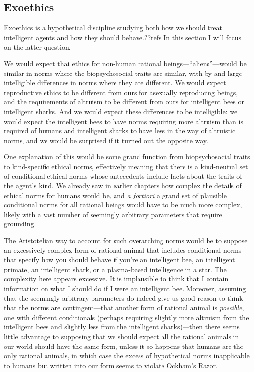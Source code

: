 \subsection{Exoethics}
Exoethics is a hypothetical discipline studying both how we should treat intelligent agents and how they should behave.??refs
In this section I will focus on the latter question.

We would expect that ethics for non-human rational beings---``aliens''---would be similar in norms 
where the biopsychosocial traits are similar, with by and large intelligible differences in norms where they are 
different. We would expect reproductive ethics to be different from ours for asexually reproducing beings, and the 
requirements of altruism to be different from ours for intelligent bees or intelligent sharks. And we would expect 
these differences to be intelligible: we would expect the intelligent bees to have norms requiring more altruism than
is required of humans and intelligent sharks to have less in the way of altruistic norms, and we would be surprised if 
it turned out the opposite way.

One explanation of this would be some grand function from biopsychosocial traits to kind-specific ethical norms, 
effectively meaning that there is a kind-neutral set of conditional ethical norms whose antecedents include facts
about the traits of the agent's kind. We already saw in earlier chapters how complex the details of ethical 
norms for humans would be, and \textit{a fortiori} a grand set of plausible conditional norms for all rational beings 
would have to be much more complex, likely with a vast number of seemingly arbitrary parameters that require grounding.

The Aristotelian way to account for such overarching norms would be to suppose an excessively complex form of rational animal that 
includes conditional norms that specify how you should behave if you're an intelligent bee, an intelligent primate, 
an intelligent shark, or a plasma-based intelligence in a star. The complexity here appears excessive. It is 
implausible to think that I contain information on what I should do if I were an intelligent bee.
Moreover, assuming that the seemingly arbitrary parameters do indeed give us good reason to think that the norms 
are contingent---that another form of rational animal is \textit{possible}, one with different conditionals (perhaps requiring
slightly more altruism from the intelligent bees and slightly less from the intelligent sharks)---then there seems 
little advantage to supposing that we should expect all the rational animals in our world should have the same 
form, unless it so happens that humans are the only rational animals, in which case the excess of hypothetical norms 
inapplicable to humans but written into our form seems to violate Ockham's Razor.

